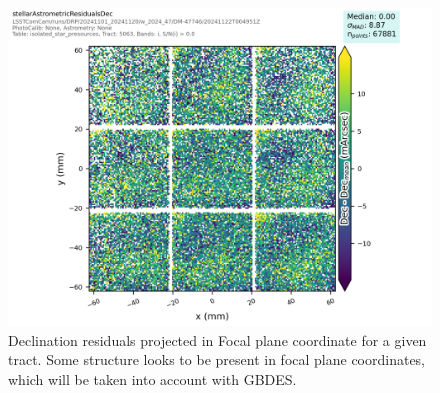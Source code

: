 \begin{figure}
        \centering
        \includegraphics[scale=0.47]{figures/e3aea76f-3ed1-4686-9a24-00abf0ff9515}
        \caption{\small Declination residuals projected in Focal plane coordinate for a given tract. Some structure looks to be present in focal plane coordinates, which will be taken into account with GBDES. }
        \label{fov_astrometry_plot}
\end{figure}
